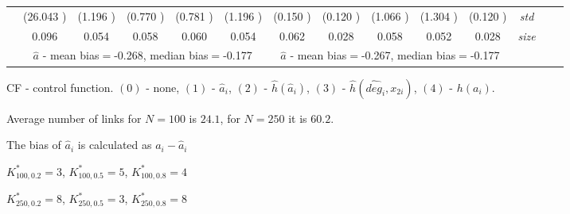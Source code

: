 \begin{table}
\begin{threeparttable}
{\begin{tabular}{|c|c|c|c|c|c|c|c|c|c|c|c|c|c|}
&(26.043 )&(1.196 )&(0.770 )&(0.781 )&(1.196 )&(0.150 )&(0.120 )&(1.066 )&(1.304 )&(0.120 )&\textit{std}\\ 
& 0.096 & 0.054 &0.058 &0.060 &0.054 &0.062& 0.028& 0.058 &0.052 &0.028 &\textit{size} \\\midrule 
&\multicolumn{5}{|c|}{$\hat{a}$ - mean bias$=$-0.268, median bias$=$-0.177 }&\multicolumn{5}{|c|}{$\hat{a}$ - mean bias$=$-0.267, median bias$=$-0.177 }&\\ \hline 
\end{tabular}} 
\begin{tablenotes}\tiny 
\item CF - control function. $(0)$ - none, $(1)$ - $\hat{a}_i$,  $(2)$ - $\hat{h}(\hat{a}_i)$, $(3)$ - $\hat{h}(\widehat{deg}_i,x_{2i})$, $(4)$ - $h(a_i)$. 
\item Average number of links for $N=100$ is $24.1$, for $N=250$ it is $60.2$. 
\item The bias of $\hat{a}_i$ is calculated as $a_i-\hat{a}_i$ 
\item $K^*_{100,0.2}=3$, $K^*_{100,0.5}=5$, $K^*_{100,0.8}=4$ 
\item $K^*_{250,0.2}=8$, $K^*_{250,0.5}=3$, $K^*_{250,0.8}=8$ 
  \end{tablenotes} 
\end{threeparttable} 
\end{table} 

